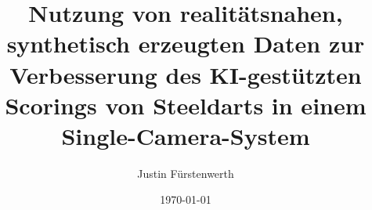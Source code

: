 
\title{Nutzung von realitätsnahen, synthetisch erzeugten Daten zur Verbesserung des KI-gestützten Scorings von Steeldarts in einem Single-Camera-System}
\author{Justin Fürstenwerth}
\date{\today}
\maketitle

\clearpage
